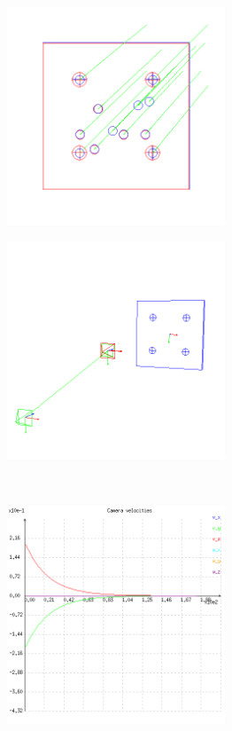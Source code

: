 \begin{figure}[ht!]
\begin{mdframed}[linecolor=black!30,backgroundcolor=black!5]
  \centering
  \begin{subfigure}{.48\linewidth}
    \centering
    \includegraphics[width=65mm]{figures/plots/ex3pimage.png}
    \caption{}
    \label{fig:ex3pimage}
  \end{subfigure}
  \begin{subfigure}{.48\linewidth}
    \centering
    \includegraphics[width=65mm]{figures/plots/ex3pscene.png}
    \caption{}
    \label{fig:ex3pscene}
  \end{subfigure}
  \\
  \begin{subfigure}{.48\linewidth}
    \centering
    \includegraphics[width=65mm]{figures/plots/ex3pvelocity.png}

\end{subfigure}
\end{mdframed}
\end{figure}
